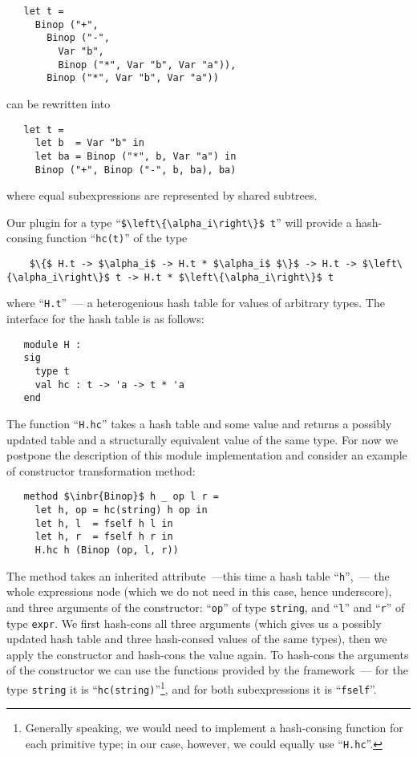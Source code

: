 \begin{lstlisting}
   let t =
     Binop ("+",
       Binop ("-",
         Var "b",
         Binop ("*", Var "b", Var "a")),
       Binop ("*", Var "b", Var "a"))
\end{lstlisting}

can be rewritten into

\begin{lstlisting}
   let t =
     let b  = Var "b" in
     let ba = Binop ("*", b, Var "a") in
     Binop ("+", Binop ("-", b, ba), ba)  
\end{lstlisting}

where equal subexpressions are represented by shared subtrees.

Our plugin for a type ``\lstinline|$\left\{\alpha_i\right\}$ t|'' will provide a hash-consing function ``\lstinline{hc(t)}'' of the type

\begin{lstlisting}
    $\{$ H.t -> $\alpha_i$ -> H.t * $\alpha_i$ $\}$ -> H.t -> $\left\{\alpha_i\right\}$ t -> H.t * $\left\{\alpha_i\right\}$ t
\end{lstlisting}

where ``\lstinline{H.t}''~--- a heterogenious hash table for values of arbitrary types. The interface for the hash table is
as follows:

\begin{lstlisting}
   module H :
   sig
     type t
     val hc : t -> 'a -> t * 'a
   end
\end{lstlisting}

The function ``\lstinline{H.hc}'' takes a hash table and some value and returns a possibly updated table and a structurally equivalent value
of the same type. For now we postpone the description of this module implementation and consider an example of constructor transformation
method:

\begin{lstlisting}   
   method $\inbr{Binop}$ h _ op l r =
     let h, op = hc(string) h op in
     let h, l  = fself h l in
     let h, r  = fself h r in
     H.hc h (Binop (op, l, r))
\end{lstlisting}

The method takes an inherited attribute~---this time a hash table ``\lstinline{h}'',~--- the whole expressions node (which we do not
need in this case, hence underscore), and three arguments of the constructor: ``\lstinline{op}'' of type \lstinline{string}, and
``\lstinline{l}'' and ``\lstinline{r}'' of type \lstinline{expr}. We first hash-cons all three arguments (which gives us a possibly updated
hash table and three hash-consed values of the same types), then we apply the constructor and hash-cons the value again. To hash-cons
the arguments of the constructor we can use the functions provided by the framework~--- for the type \lstinline{string} it is
``\lstinline{hc(string)}''\footnote{Generally speaking, we would need to implement a hash-consing function for each primitive type; in
  our case, however, we could equally use ``\lstinline{H.hc}''.}, and for both subexpressions it is ``\lstinline{fself}''.

